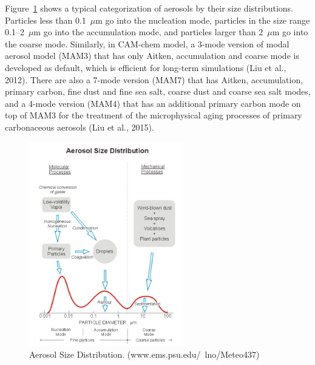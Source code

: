 \documentclass[12pt]{article}
\begin{document}
		Figure~\ref{fig_P4} shows a typical categorization of 	aerosols by their size distributions. Particles less than 0.1~$\mu$m go into the nucleation mode, particles in the size range 0.1--2~$\mu$m go into the accumulation mode, and particles larger than 2~$\mu$m go into the coarse mode. Similarly, in CAM-chem model, a 3-mode version of modal aerosol model (MAM3) that has only Aitken, accumulation and coarse mode is developed as default, which is efficient for long-term simulations (Liu et al., 2012). There are also a 7-mode version (MAM7) that has Aitken, accumulation, primary carbon, fine dust and fine sea salt, coarse dust and coarse sea salt modes, and a 4-mode version (MAM4) that has an additional primary carbon mode on top of MAM3 for the treatment of the microphysical aging processes of primary carbonaceous aerosols (Liu et al., 2015). 
	\begin{figure}[H] 
		\begin{center}
			\includegraphics[width = 0.6\textwidth]{Figure04}
			\caption[]{\label{fig_P4} Aerosol Size Distribution. (www.ems.psu.edu/~lno/Meteo437)}
		\end{center}
	\end{figure}
		
\end{document}
